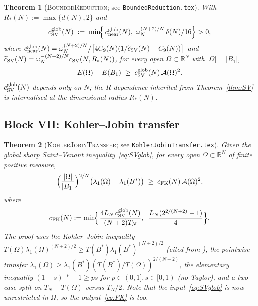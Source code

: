 \documentclass[11pt]{article}
\newtheorem{theorem}{Theorem}[section]
\theoremstyle{definition}
\newcommand{\R}{\mathbb{R}}
\newcommand{\Fr}{\mathcal{A}}
\newcommand{\Om}{\Omega}
\begin{document}
\begin{theorem}[\textsc{BoundedReduction}; see
\texttt{BoundedReduction.tex}]\label{thm:BR}
With $R_{*}(N):=\max\{d(N),2\}$ and
\begin{equation}\label{eq:cSVglob}
   c_{\rm SV}^{\rm glob}(N)\;:=\;
   \min\!\Bigl\{\,
      c_{\rm near}^{\rm glob}(N),\;
      \omega_{N}^{(N+2)/N}\,\delta(N)/16
   \Bigr\}>0,
\end{equation}
where
$c_{\rm near}^{\rm glob}(N)=\omega_{N}^{(N+2)/N}\bigl/\bigl[
4C_{9}(N)(1/\widetilde c_{\rm SV}(N)+C_{9}(N))\bigr]$
and $\widetilde c_{\rm SV}(N)=\omega_{N}^{-(N+2)/N}c_{\rm SV}(N,R_{*}(N))$,
for every open $\Om\subset\R^{N}$ with $|\Om|=|B_{1}|$,
\begin{equation}\label{eq:SVglob}
   E(\Om)-E(B_{1})\;\ge\;c_{\rm SV}^{\rm glob}(N)\,\Fr(\Om)^{2}.
\end{equation}
$c_{\rm SV}^{\rm glob}(N)$ depends only on $N$; the
$R$-dependence inherited from Theorem~\ref{thm:SV} is internalised at
the dimensional radius $R_{*}(N)$.
\end{theorem}

\subsection{Block VII: Kohler--Jobin transfer}

\begin{theorem}[\textsc{KohlerJobinTransfer}; see
\texttt{KohlerJobinTransfer.tex}]\label{thm:KJ}
Given the global sharp Saint--Venant inequality~\eqref{eq:SVglob},
for every open $\Om\subset\R^{N}$ of finite positive measure,
\begin{equation}\label{eq:FK}
   \Bigl(\frac{|\Om|}{|B_1|}\Bigr)^{2/N}
   \bigl(\lambda_1(\Om)-\lambda_1(B^*)\bigr)
   \;\ge\;c_{\rm FK}(N)\,\Fr(\Om)^2,
\end{equation}
where
\begin{equation}\label{eq:cFKdef}
   c_{\rm FK}(N)
   :=\min\!\Bigl\{\,
       \frac{4L_N\,c_{\rm SV}^{\rm glob}(N)}{(N+2)T_N},\;\;
       \frac{L_N(2^{2/(N+2)}-1)}{4}
   \Bigr\}.
\end{equation}
The proof uses the Kohler--Jobin inequality
$T(\Om)\lambda_1(\Om)^{(N+2)/2}\ge T(B^*)\lambda_1(B^*)^{(N+2)/2}$
(cited from \cite[Thm~3.3]{Brasco2014}), the pointwise transfer
$\lambda_1(\Om)\ge\lambda_1(B^*)(T(B^*)/T(\Om))^{2/(N+2)}$, the elementary
inequality $(1-s)^{-p}-1\ge p s$ for $p\in(0,1], s\in[0,1)$ (no
Taylor), and a two-case split on $T_N-T(\Om)$ versus $T_N/2$. Note
that the input~\eqref{eq:SVglob} is now unrestricted in $\Om$, so the
output~\eqref{eq:FK} is too.
\end{theorem}
\end{document}
